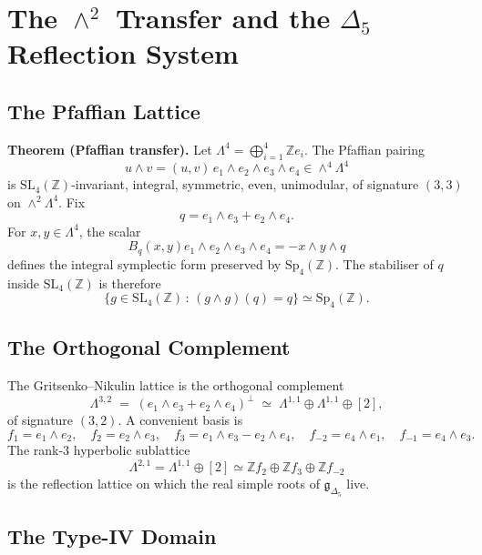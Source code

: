 \providecommand{\cH}{\mathcal{H}}
\providecommand{\cC}{\mathcal{C}}
\providecommand{\Real}{\mathrm{Re}}
\providecommand{\Imag}{\mathrm{Im}}
\providecommand{\Pfaff}{\mathrm{Pf}}
\providecommand{\DeltaFive}{\Delta{}_{5}}
\providecommand{\PhiTen}{\Phi{}_{10}}
\providecommand{\CoHA}{\operatorname{CoHA}}

\section*{The $\wedge^2$ Transfer and the $\DeltaFive$ Reflection System}

\subsection*{The Pfaffian Lattice}

\noindent\textbf{Theorem (Pfaffian transfer).}
Let $\Lambda^4 = \bigoplus_{i=1}^{4}\mathbb{Z}e_i$. The Pfaffian pairing
\[
u \wedge v = (u,v)\, e_1\wedge e_2\wedge e_3\wedge e_4 \in \wedge^4\Lambda^4
\]
is $\mathrm{SL}_4(\mathbb{Z})$-invariant, integral, symmetric, even, unimodular,
of signature $(3,3)$ on $\wedge^2\Lambda^4$. Fix
\[
q = e_1\wedge e_3 + e_2\wedge e_4 .
\]
For $x,y\in\Lambda^4$, the scalar
\[
B_q(x,y)e_1\wedge e_2\wedge e_3\wedge e_4 = -x\wedge y\wedge q
\]
defines the integral symplectic form preserved by $\mathrm{Sp}_4(\mathbb{Z})$.
The stabiliser of $q$ inside $\mathrm{SL}_4(\mathbb{Z})$ is therefore
\[
\{g \in \mathrm{SL}_4(\mathbb{Z})\,:\, (g\wedge g)(q) = q\}
\simeq \mathrm{Sp}_4(\mathbb{Z}).
\]

\subsection*{The Orthogonal Complement}

The Gritsenko--Nikulin lattice is the orthogonal complement
\[
\Lambda^{3,2} \;=\; (e_1\wedge e_3 + e_2\wedge e_4)^{\perp}
\;\simeq\; \Lambda^{1,1}\oplus\Lambda^{1,1}\oplus[2],
\]
of signature $(3,2)$. A convenient basis is
\[
f_1 = e_1\wedge e_2,\quad f_2 = e_2\wedge e_3,\quad
f_3 = e_1\wedge e_3 - e_2\wedge e_4,\quad
f_{-2} = e_4\wedge e_1,\quad f_{-1} = e_4\wedge e_3.
\]
The rank-$3$ hyperbolic sublattice
\[
\Lambda^{2,1}=\Lambda^{1,1}\oplus[2]
\simeq\mathbb{Z}f_2\oplus\mathbb{Z}f_3\oplus\mathbb{Z}f_{-2}
\]
is the reflection lattice on which the real simple roots of
$\mathfrak{g}_{\DeltaFive}$ live.

\subsection*{The Type-IV Domain}

